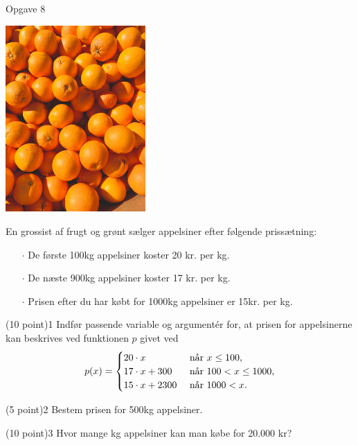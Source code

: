 \documentclass[12pt,x11names,a4paper]{article}
\begin{document}
\begin{opgavetekst}{Opgave 8}
\begin{center}
\includegraphics[width = 0.4\textwidth]{Billeder/appelsin}
\end{center}
En grossist af frugt og grønt sælger appelsiner efter følgende prissætning:
\begin{itemize}
\item[$\cdot$] De første 100kg appelsiner koster 20 kr. per kg.
\item[$\cdot$] De næste 900kg appelsiner koster 17 kr. per kg.
\item[$\cdot$] Prisen efter du har købt for 1000kg appelsiner er 15kr. per kg. 
\end{itemize} \phantom{h}
\end{opgavetekst}

\begin{delopgave}{(10 point)}{1}
Indfør passende variable og argumentér for, at prisen for appelsinerne kan beskrives ved funktionen $p$ givet ved
\begin{align*}
p(x) = \begin{cases}
20\cdot x \ &\textnormal{når } x\leq 100,\\
17\cdot x + 300 \ &\textnormal{når }100 < x \leq 1000,\\
15\cdot x + 2300 \ &\textnormal{når } 1000 < x.   
\end{cases}
\end{align*}

\end{delopgave}

\begin{delopgave}{(5 point)}{2}
Bestem prisen for 500kg appelsiner.
\end{delopgave}

\begin{delopgave}{(10 point)}{3}
Hvor mange kg appelsiner kan man købe for 20.000 kr?
\end{delopgave}
\end{document}
